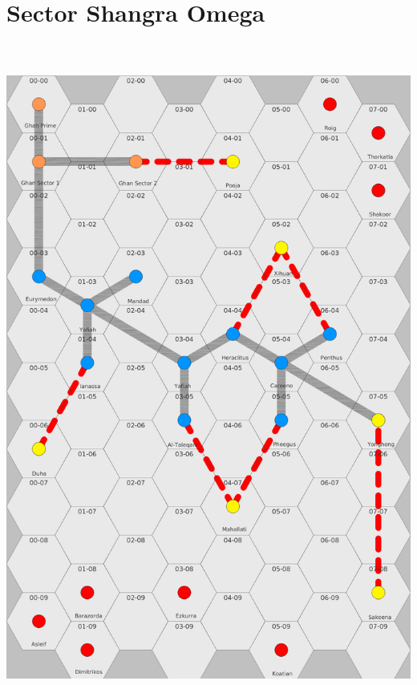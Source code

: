 \documentclass[10pt,twoside]{article}
\begin{document}
  \newpage
  

  \section{Sector Shangra Omega}
  
  \begin{center}
    \includegraphics[height=220mm]{sectormap}
  \end{center}
  
  \newpage
  
\end{document}
